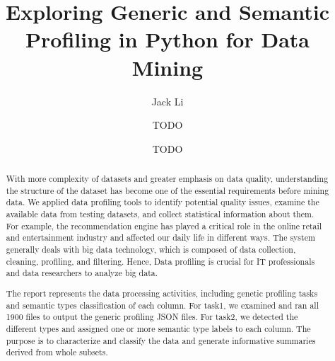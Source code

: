\documentclass[sigconf]{acmart}
\begin{document}
\title{Exploring Generic and Semantic Profiling in Python for Data Mining}

\author{Jack Li}

\author{TODO}

\author{TODO}



\begin{abstract}
    With more complexity of datasets and greater emphasis on data quality, understanding the structure of the dataset has become one of the essential requirements before mining data. We applied data profiling tools to identify potential quality issues, examine the available data from testing datasets, and collect statistical information about them. For example, the recommendation engine has played a critical role in the online retail and entertainment industry and affected our daily life in different ways. The system generally deals with big data technology, which is composed of data collection, cleaning, profiling, and filtering. Hence, Data profiling is crucial for IT professionals and data researchers to analyze big data. 
    
    The report represents the data processing activities, including genetic profiling tasks and semantic types classification of each column. For task1, we examined and ran all 1900 files to output the generic profiling JSON files. For task2, we detected the different types and assigned one or more semantic type labels to each column. The purpose is to characterize and classify the data and generate informative summaries derived from whole subsets.
\end{abstract}
\end{document}
